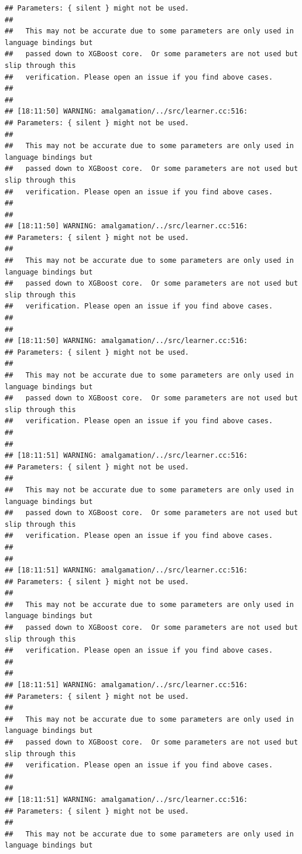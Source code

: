 \documentclass[AMS,STIX2COL]{WileyNJD-v2}\usepackage[]{graphicx}\usepackage[]{color}
\makeatletter
\newenvironment{kframe}{%
 \def\at@end@of@kframe{}%
 \ifinner\ifhmode%
  \def\at@end@of@kframe{\end{minipage}}%
  \begin{minipage}{\columnwidth}%
 \fi\fi%
 \def\FrameCommand##1{\hskip\@totalleftmargin \hskip-\fboxsep
 \colorbox{shadecolor}{##1}\hskip-\fboxsep
     \hskip-\linewidth \hskip-\@totalleftmargin \hskip\columnwidth}%
 \MakeFramed {\advance\hsize-\width
   \@totalleftmargin\z@ \linewidth\hsize
   \@setminipage}}%
 {\par\unskip\endMakeFramed%
 \at@end@of@kframe}
\newenvironment{knitrout}{}{} %
\makeatother
\begin{document}
\begin{knitrout}
\begin{kframe}
\begin{verbatim}
## Parameters: { silent } might not be used.
## 
##   This may not be accurate due to some parameters are only used in language bindings but
##   passed down to XGBoost core.  Or some parameters are not used but slip through this
##   verification. Please open an issue if you find above cases.
## 
## 
## [18:11:50] WARNING: amalgamation/../src/learner.cc:516: 
## Parameters: { silent } might not be used.
## 
##   This may not be accurate due to some parameters are only used in language bindings but
##   passed down to XGBoost core.  Or some parameters are not used but slip through this
##   verification. Please open an issue if you find above cases.
## 
## 
## [18:11:50] WARNING: amalgamation/../src/learner.cc:516: 
## Parameters: { silent } might not be used.
## 
##   This may not be accurate due to some parameters are only used in language bindings but
##   passed down to XGBoost core.  Or some parameters are not used but slip through this
##   verification. Please open an issue if you find above cases.
## 
## 
## [18:11:50] WARNING: amalgamation/../src/learner.cc:516: 
## Parameters: { silent } might not be used.
## 
##   This may not be accurate due to some parameters are only used in language bindings but
##   passed down to XGBoost core.  Or some parameters are not used but slip through this
##   verification. Please open an issue if you find above cases.
## 
## 
## [18:11:51] WARNING: amalgamation/../src/learner.cc:516: 
## Parameters: { silent } might not be used.
## 
##   This may not be accurate due to some parameters are only used in language bindings but
##   passed down to XGBoost core.  Or some parameters are not used but slip through this
##   verification. Please open an issue if you find above cases.
## 
## 
## [18:11:51] WARNING: amalgamation/../src/learner.cc:516: 
## Parameters: { silent } might not be used.
## 
##   This may not be accurate due to some parameters are only used in language bindings but
##   passed down to XGBoost core.  Or some parameters are not used but slip through this
##   verification. Please open an issue if you find above cases.
## 
## 
## [18:11:51] WARNING: amalgamation/../src/learner.cc:516: 
## Parameters: { silent } might not be used.
## 
##   This may not be accurate due to some parameters are only used in language bindings but
##   passed down to XGBoost core.  Or some parameters are not used but slip through this
##   verification. Please open an issue if you find above cases.
## 
## 
## [18:11:51] WARNING: amalgamation/../src/learner.cc:516: 
## Parameters: { silent } might not be used.
## 
##   This may not be accurate due to some parameters are only used in language bindings but

\end{verbatim}
\end{kframe}
\end{knitrout}
\end{document}
